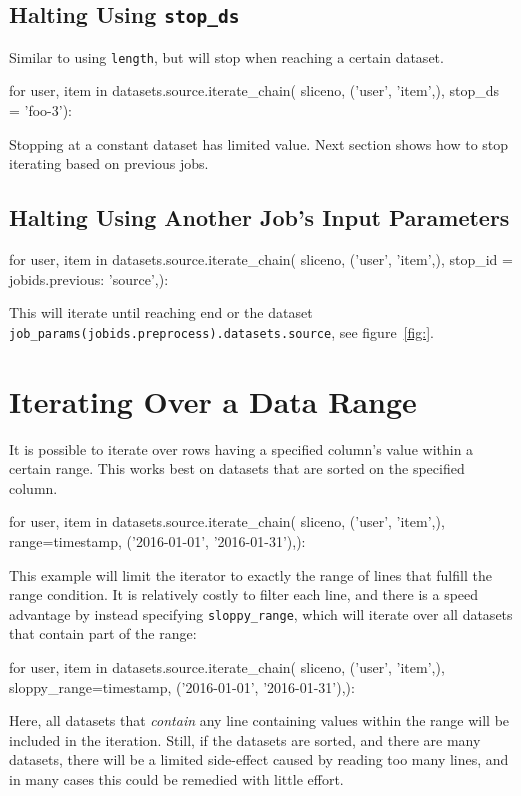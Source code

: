 \subsection*{Halting Using \texttt{stop\_ds}}
Similar to using \texttt{length}, but will stop when reaching a
certain dataset.
\begin{python}
for user, item in datasets.source.iterate_chain(
    sliceno, ('user', 'item',),
    stop_ds = 'foo-3'):
\end{python}
Stopping at a constant dataset has limited value.  Next section shows
how to stop iterating based on previous jobs.



\subsection*{Halting Using Another Job's Input Parameters}
\begin{python}
for user, item in datasets.source.iterate_chain(
    sliceno, ('user', 'item',),
    stop_id = {jobids.previous: 'source',}):
\end{python}
This will iterate until reaching end or the dataset
\texttt{job\_params(jobids.preprocess).datasets.source}, see figure~\ref{fig:}.



\section{Iterating Over a Data Range}
\label{sec:iterate_sloppy_range}
It is possible to iterate over rows having a specified column's value
within a certain range.  This works best on datasets that are sorted
on the specified column.
\begin{python}
for user, item in datasets.source.iterate_chain(
    sliceno, ('user', 'item',),
    range={timestamp, ('2016-01-01', '2016-01-31'),}):
\end{python}
This example will limit the iterator to exactly the range of lines
that fulfill the range condition.  It is relatively costly to filter
each line, and there is a speed advantage by instead specifying
\texttt{sloppy\_range}, which will iterate over all datasets that
contain part of the range:
\begin{python}
for user, item in datasets.source.iterate_chain(
    sliceno, ('user', 'item',),
    sloppy_range={timestamp, ('2016-01-01', '2016-01-31'),}):
\end{python}
Here, all datasets that \textsl{contain} any line containing values
within the range will be included in the iteration.  Still, if the
datasets are sorted, and there are many datasets, there will be a
limited side-effect caused by reading too many lines, and in many
cases this could be remedied with little effort.



